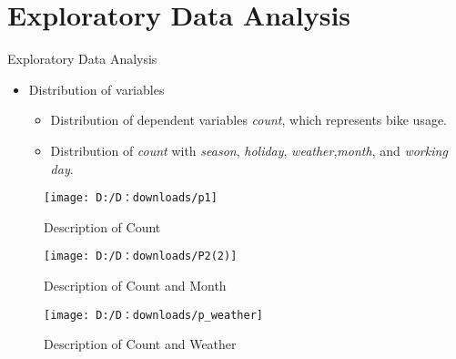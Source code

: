 \documentclass[
 size=14pt,
 paper=smartboard,  %
 mode=present, 		%
 display=slides, 	%
 style=tuliplab,  	%
 pauseslide,
 fleqn,leqno]{powerdot}
\begin{document}
\section{Exploratory Data Analysis}






\begin{slide}[toc=,bm=]{Exploratory Data Analysis}
\begin{itemize}
\item
Distribution of variables
		
\begin{itemize}
\item
Distribution of dependent variables \emph{count}, which represents bike usage.
			
\item
 Distribution of \emph{count} with \emph{season}, \emph{holiday}, \emph{weather},\emph{month}, and \emph{working day}.		
			
	
\end{itemize}
\end{itemize}
	
\begin{center}
\begin{minipage}{0.3\linewidth}
\centering

\begin{figure}
	\caption{Description of Count}
	\texttt{[image: D:/D：downloads/p1]}
\end{figure}

\end{minipage}
\hfill
\begin{minipage}{0.3\linewidth}
\centering

\begin{figure}
	\caption{Description of Count and Month}
	\texttt{[image: D:/D：downloads/P2(2)]}
\end{figure}		

\end{minipage}
\hfill
\begin{minipage}{0.3\linewidth}
\centering

\begin{figure}
	\caption{Description of Count and Weather}
	\texttt{[image: D:/D：downloads/p\_weather]}
\end{figure}


\end{minipage}
\end{center}
	
	
\end{slide}
\end{document}
